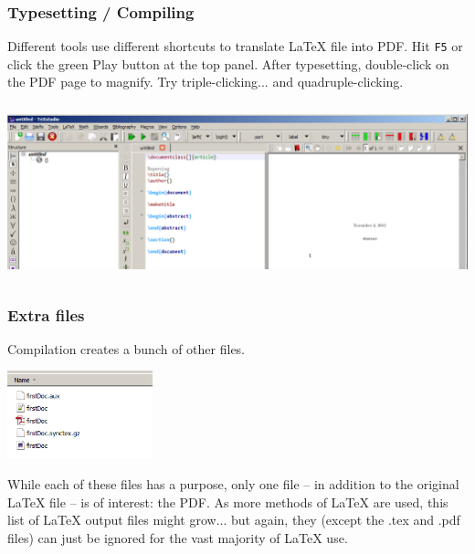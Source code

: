 \documentclass[slidestop,compress,mathserif]{beamer}
\begin{document}
\begin{frame} \frametitle{Typesetting / Compiling}
Different tools use different shortcuts to translate LaTeX file into PDF. Hit \texttt{\color{highlight}F5} or click the green {\color{highlight}Play} button at the top panel. After typesetting, double-click on the PDF page to magnify. Try triple-clicking... and quadruple-clicking.
\begin{center}
	\includegraphics[height=2.0in]{basicsOfLatex/gettingStarted/texstudiofirstOutput}
\end{center}
\end{frame}

\begin{frame} \frametitle{Extra files}
Compilation creates a bunch of other files.
\begin{center}
	\includegraphics[height=1.0in]{basicsOfLatex/gettingStarted/texstudioExtraFiles}
\end{center}

While each of these files has a purpose, only one file -- in addition to the original LaTeX file -- is of interest: the PDF. As more methods of LaTeX are used, this list of LaTeX output files might grow... but again, they (except the .tex and .pdf files) can just be ignored for the vast majority of LaTeX use.
\end{frame}
\end{document}
